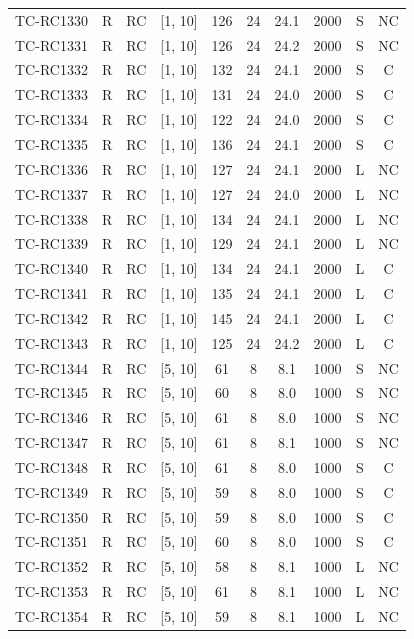 \begin{longtable}{lccccccccc}
TC-RC1330 & R & RC & [1, 10] & 126 & 24 & 24.1 & 2000 & S & NC \\
TC-RC1331 & R & RC & [1, 10] & 126 & 24 & 24.2 & 2000 & S & NC \\
TC-RC1332 & R & RC & [1, 10] & 132 & 24 & 24.1 & 2000 & S & C \\
TC-RC1333 & R & RC & [1, 10] & 131 & 24 & 24.0 & 2000 & S & C \\
TC-RC1334 & R & RC & [1, 10] & 122 & 24 & 24.0 & 2000 & S & C \\
TC-RC1335 & R & RC & [1, 10] & 136 & 24 & 24.1 & 2000 & S & C \\
TC-RC1336 & R & RC & [1, 10] & 127 & 24 & 24.1 & 2000 & L & NC \\
TC-RC1337 & R & RC & [1, 10] & 127 & 24 & 24.0 & 2000 & L & NC \\
TC-RC1338 & R & RC & [1, 10] & 134 & 24 & 24.1 & 2000 & L & NC \\
TC-RC1339 & R & RC & [1, 10] & 129 & 24 & 24.1 & 2000 & L & NC \\
TC-RC1340 & R & RC & [1, 10] & 134 & 24 & 24.1 & 2000 & L & C \\
TC-RC1341 & R & RC & [1, 10] & 135 & 24 & 24.1 & 2000 & L & C \\
TC-RC1342 & R & RC & [1, 10] & 145 & 24 & 24.1 & 2000 & L & C \\
TC-RC1343 & R & RC & [1, 10] & 125 & 24 & 24.2 & 2000 & L & C \\
TC-RC1344 & R & RC & [5, 10] & 61 & 8 & 8.1 & 1000 & S & NC \\
TC-RC1345 & R & RC & [5, 10] & 60 & 8 & 8.0 & 1000 & S & NC \\
TC-RC1346 & R & RC & [5, 10] & 61 & 8 & 8.0 & 1000 & S & NC \\
TC-RC1347 & R & RC & [5, 10] & 61 & 8 & 8.1 & 1000 & S & NC \\
TC-RC1348 & R & RC & [5, 10] & 61 & 8 & 8.0 & 1000 & S & C \\
TC-RC1349 & R & RC & [5, 10] & 59 & 8 & 8.0 & 1000 & S & C \\
TC-RC1350 & R & RC & [5, 10] & 59 & 8 & 8.0 & 1000 & S & C \\
TC-RC1351 & R & RC & [5, 10] & 60 & 8 & 8.0 & 1000 & S & C \\
TC-RC1352 & R & RC & [5, 10] & 58 & 8 & 8.1 & 1000 & L & NC \\
TC-RC1353 & R & RC & [5, 10] & 61 & 8 & 8.1 & 1000 & L & NC \\
TC-RC1354 & R & RC & [5, 10] & 59 & 8 & 8.1 & 1000 & L & NC \\

\end{longtable}
